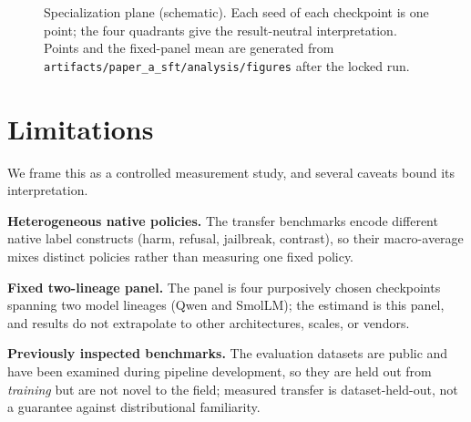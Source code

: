 \documentclass[sigconf,nonacm]{acmart}
\begin{document}
\begin{figure}[t]
\centering
{}
\caption{Specialization plane (schematic). Each seed of each checkpoint is one point; the four quadrants give the result-neutral interpretation. Points and the fixed-panel mean are generated from \texttt{artifacts/paper\_a\_sft/analysis/figures} after the locked run.}
\label{fig:plane}
\end{figure}

\section{Limitations}
\label{sec:limitations}

We frame this as a controlled measurement study, and several caveats bound its interpretation.

\textbf{Heterogeneous native policies.} The transfer benchmarks encode different native label constructs (harm, refusal, jailbreak, contrast), so their macro-average mixes distinct policies rather than measuring one fixed policy.

\textbf{Fixed two-lineage panel.} The panel is four purposively chosen checkpoints spanning two model lineages (Qwen and SmolLM); the estimand is this panel, and results do not extrapolate to other architectures, scales, or vendors.

\textbf{Previously inspected benchmarks.} The evaluation datasets are public and have been examined during pipeline development, so they are held out from \emph{training} but are not novel to the field; measured transfer is dataset-held-out, not a guarantee against distributional familiarity.
\end{document}
